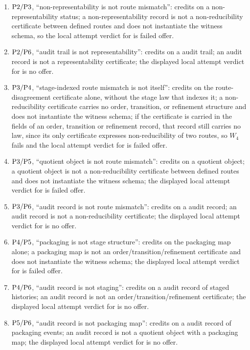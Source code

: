 \begin{enumerate}[topsep=2pt,itemsep=2pt,label=\textup{(\arabic*)}]
    credits \Ptwo{} on \Pfour{} stage content; a representability certificate
    with realization relation is required, and stage variation supplies none, so
    the local attempt verdict for \Ptwo{} is no offer.
  \item \(\mathrm{P2}{}/\mathrm{P3}{}\), ``non-representability is not route mismatch'':
    credits \Pthree{} on a \Ptwo{} non-representability status; a
    non-representability record is not a non-reducibility certificate between
    defined routes and does not instantiate the \Pthree{} witness schema, so the
    local attempt verdict for \Pthree{} is failed offer.
  \item \(\mathrm{P2}{}/\mathrm{P6}{}\), ``audit trail is not representability'': credits
    \Ptwo{} on a \Psix{} audit trail; an audit record is not a representability
    certificate; the displayed local attempt verdict for \Ptwo{} is no offer.
  \item \(\mathrm{P3}{}/\mathrm{P4}{}\), ``stage-indexed route mismatch is not \Pfour{}
    itself'': credits \Pfour{} on the \Pthree{} route-disagreement certificate
    alone, without the stage law that indexes it; a non-reducibility
    certificate carries no order, transition, or
    refinement structure and does not instantiate the \Pfour{} witness schema;
    if the certificate is carried in the fields of an order, transition or
    refinement record, that record still carries no law, since its only
    certificate expresses non-reducibility of two routes, so \(W_4\) fails and
    the local attempt verdict for \Pfour{} is failed offer.
  \item \(\mathrm{P3}{}/\mathrm{P5}{}\), ``quotient object is not route mismatch'':
    credits \Pthree{} on a \Pfive{} quotient object; a quotient object is not a
    non-reducibility certificate between defined routes and does not instantiate
    the \Pthree{} witness schema; the displayed local attempt verdict for \Pthree{} is
    failed offer.
  \item \(\mathrm{P3}{}/\mathrm{P6}{}\), ``audit record is not route mismatch'': credits
    \Pthree{} on a \Psix{} audit record; an audit record is not a
    non-reducibility certificate; the displayed local attempt verdict for \Pthree{} is
    no offer.
  \item \(\mathrm{P4}{}/\mathrm{P5}{}\), ``packaging is not stage structure'': credits
    \Pfour{} on the \Pfive{} packaging map alone; a packaging map is not an
    order/transition/refinement certificate and does not instantiate the
    \Pfour{} witness schema; the displayed local attempt verdict for \Pfour{} is failed offer.
  \item \(\mathrm{P4}{}/\mathrm{P6}{}\), ``audit record is not staging'': credits \Pfour{}
    on a \Psix{} audit record of staged histories; an audit record is not an
    order/transition/refinement certificate; the displayed local attempt verdict for \Pfour{} is
    no offer.
  \item \(\mathrm{P5}{}/\mathrm{P6}{}\), ``audit record is not packaging map'': credits
    \Pfive{} on a \Psix{} audit record of packaging events; an audit record is
    not a quotient object with a packaging map; the displayed local attempt verdict for \Pfive{} is
    no offer.
\end{enumerate}
